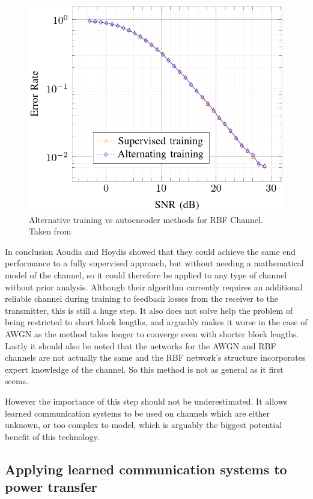 \documentclass[12pt,onecolumn,letterpaper]{article}
\newcommand\genfigsize{0.5}
\begin{document}
\begin{figure}[t]
   \centering
   \includegraphics[width=\genfigsize\linewidth]{figures/Aoudia_RBF_performance.PNG}
   \caption{Alternative training vs autoencoder methods for RBF Channel. Taken from~\cite{Aoudia}}
\label{fig:AoudiaPerformanceRbf}
\end{figure}

In conclusion Aoudia and Hoydis showed that they could achieve the same end performance to a fully supervised approach, but without needing a mathematical model of the channel, so it could therefore be applied to any type of channel without prior analysis. 
Although their algorithm currently requires an additional reliable channel during training to feedback losses from the receiver to the transmitter, this is still a huge step. It also does not solve help the problem of being restricted to short block lengths, and arguably makes it worse in the case of AWGN as the method takes longer to converge even with shorter block lengths. Lastly it should also be noted that the networks for the AWGN and RBF channels are not actually the same and the RBF network's structure incorporates expert knowledge of the channel. So this method is not as general as it first seems.

However the importance of this step should not be underestimated. It allows learned communication systems to be used on channels which are either unknown, or too complex to model, which is arguably the biggest potential benefit of this technology. 

\FloatBarrier
\subsection{Applying learned communication systems to power transfer}
\end{document}
